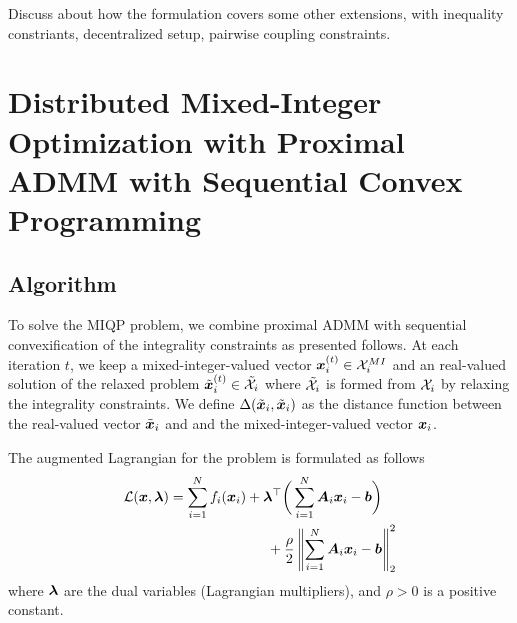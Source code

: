 \documentclass[twocolumn,amsthm]{autart}%
\theoremstyle{definition}
\newtheorem{definition}{Definition}
\theoremstyle{plain}
\begin{document}


Discuss about how the formulation covers some other extensions, \eg with inequality constriants, decentralized setup, pairwise coupling constraints. 

\section{Distributed Mixed-Integer Optimization with Proximal ADMM with Sequential Convex Programming}

\subsection{Algorithm}

To solve the MIQP problem, we combine proximal ADMM \cite{yang2022proximal} with sequential convexification of the integrality constraints as presented follows.
At each iteration $t$, we keep a mixed-integer-valued vector $\boldsymbol{x}_i^{(t)} \in \mathcal{X}_i^{\relax{MI}}$ and an real-valued solution of the relaxed problem $\tilde{\boldsymbol{x}}_i^{(t)} \in \tilde{\mathcal{X}}_i$ where $\tilde{\mathcal{X}}_i$ is formed from $\mathcal{X}_i$ by relaxing the integrality constraints.
We define $\Delta (\tilde{\boldsymbol{x}}_i, \tilde{\boldsymbol{x}}_i)$ as the distance function between the real-valued vector $\tilde{\boldsymbol{x}}_i$ and and the mixed-integer-valued vector $\boldsymbol{x}_i$.

The augmented Lagrangian for the problem is formulated as follows
\begin{equation}
\begin{multlined}
\LLL (\bbsym{x}, \bbsym{\lambda}) = \sum_{i=1}^{N} f_i ( \bbsym{x}_i) + \bbsym{\lambda}^\top \bigg(\sum_{i=1}^{N} \bbsym{A}_{i} \bbsym{x}_i - \bbsym{b} \bigg) \\
+ \frac{\rho}{2} \norm{\sum_{i=1}^{N} \bbsym{A}_{i} \bbsym{x}_i - \bbsym{b}}_2^2
\end{multlined}
\end{equation}
where $\boldsymbol{\lambda}$ are the dual variables (Lagrangian multipliers), and $\rho > 0$ is a positive constant.
\end{document}
